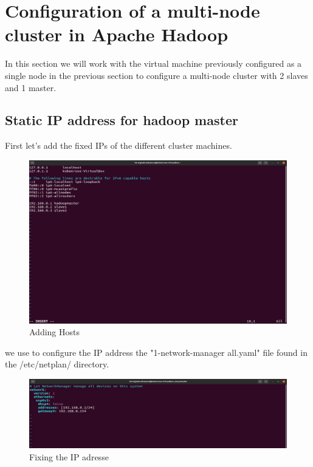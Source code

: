 \chapter{Configuration of a multi-node cluster in Apache Hadoop}
\par In this section we will work with the virtual machine previously configured as a single node in the previous section to configure a multi-node cluster with 2 slaves and 1 master.
\begin{spacing}{1.2}
\section{Static IP address for hadoop master}

\par First let's add the fixed IPs of the different cluster machines.
\\
\begin{figure}[!htb] 
\begin{center} 
\includegraphics[width=1\linewidth]{Big_Data/Hadoop/Multi-Nodes Cluster/Adding Hosts} 
\end{center} 
\caption{Adding Hosts} 
\end{figure} 
\FloatBarrier



\par we use to configure the IP address the "1-network-manager all.yaml" file found in the /etc/netplan/ directory.
\\
\begin{figure}[!htb] 
\begin{center} 
\includegraphics[width=1\linewidth]{Big_Data/Hadoop/Multi-Nodes Cluster/Fixing the IP adresse} 
\end{center} 
\caption{Fixing the IP adresse} 
\end{figure} 
\FloatBarrier


\end{spacing}
